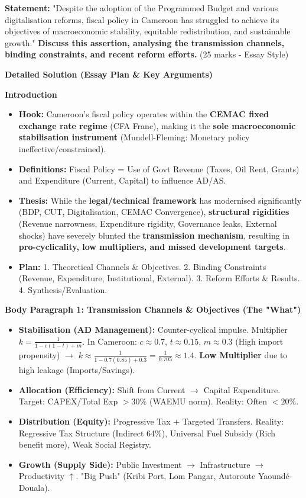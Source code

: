 \documentclass[11pt]{article}
\begin{document}
\begin{exoresolu}
\textbf{Statement:}
"Despite the adoption of the Programmed Budget and various digitalisation reforms, fiscal policy in Cameroon has struggled to achieve its objectives of macroeconomic stability, equitable redistribution, and sustainable growth." 
\textbf{Discuss this assertion, analysing the transmission channels, binding constraints, and recent reform efforts.} (25 marks - Essay Style)

\tcblower
\textbf{Detailed Solution (Essay Plan \& Key Arguments)}

\textbf{Introduction}
\begin{itemize}
    \item \textbf{Hook:} Cameroon's fiscal policy operates within the \textbf{CEMAC fixed exchange rate regime} (CFA Franc), making it the \textbf{sole macroeconomic stabilisation instrument} (Mundell-Fleming: Monetary policy ineffective/constrained).
    \item \textbf{Definitions:} Fiscal Policy = Use of Govt Revenue (Taxes, Oil Rent, Grants) and Expenditure (Current, Capital) to influence AD/AS.
    \item \textbf{Thesis:} While the \textbf{legal/technical framework} has modernised significantly (BDP, CUT, Digitalisation, CEMAC Convergence), \textbf{structural rigidities} (Revenue narrowness, Expenditure rigidity, Governance leaks, External shocks) have severely blunted the \textbf{transmission mechanism}, resulting in \textbf{pro-cyclicality, low multipliers, and missed development targets}.
    \item \textbf{Plan:} 1. Theoretical Channels \& Objectives. 2. Binding Constraints (Revenue, Expenditure, Institutional, External). 3. Reform Efforts \& Results. 4. Synthesis/Evaluation.
\end{itemize}

\textbf{Body Paragraph 1: Transmission Channels \& Objectives (The "What")} 
\begin{itemize}
    \item \textbf{Stabilisation (AD Management):} Counter-cyclical impulse. Multiplier $k = \frac{1}{1-c(1-t)+m}$. In Cameroon: $c \approx 0.7$, $t \approx 0.15$, $m \approx 0.3$ (High import propensity) $\rightarrow$ $k \approx \frac{1}{1-0.7(0.85)+0.3} = \frac{1}{0.705} \approx 1.4$. \textbf{Low Multiplier} due to high leakage (Imports/Savings).
    \item \textbf{Allocation (Efficiency):} Shift from Current $\rightarrow$ Capital Expenditure. Target: CAPEX/Total Exp $> 30\%$ (WAEMU norm). Reality: Often $< 20\%$.
    \item \textbf{Distribution (Equity):} Progressive Tax + Targeted Transfers. Reality: Regressive Tax Structure (Indirect 64\%), Universal Fuel Subsidy (Rich benefit more), Weak Social Registry.
    \item \textbf{Growth (Supply Side):} Public Investment $\rightarrow$ Infrastructure $\rightarrow$ Productivity $\uparrow$. "Big Push" (Kribi Port, Lom Pangar, Autoroute Yaoundé-Douala).
\end{itemize}


\end{exoresolu}
\end{document}
